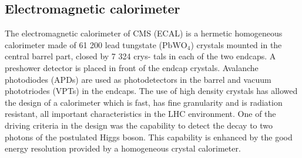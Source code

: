 \subsection{Electromagnetic calorimeter}
The electromagnetic calorimeter of CMS (ECAL) is a hermetic homogeneous calorimeter made of
61 200 lead tungstate ($\textrm{PbWO}_{\textrm{4}}$) crystals mounted in the central barrel part, closed by 7 324 crys-
tals in each of the two endcaps. A preshower detector is placed in front of the endcap crystals.
Avalanche photodiodes (APDs) are used as photodetectors in the barrel and vacuum phototriodes
(VPTs) in the endcaps. The use of high density crystals has allowed the design of a calorimeter
which is fast, has fine granularity and is radiation resistant, all important characteristics in the LHC
environment. One of the driving criteria in the design was the capability to detect the decay to two
photons of the postulated Higgs boson. This capability is enhanced by the good energy resolution
provided by a homogeneous crystal calorimeter.

